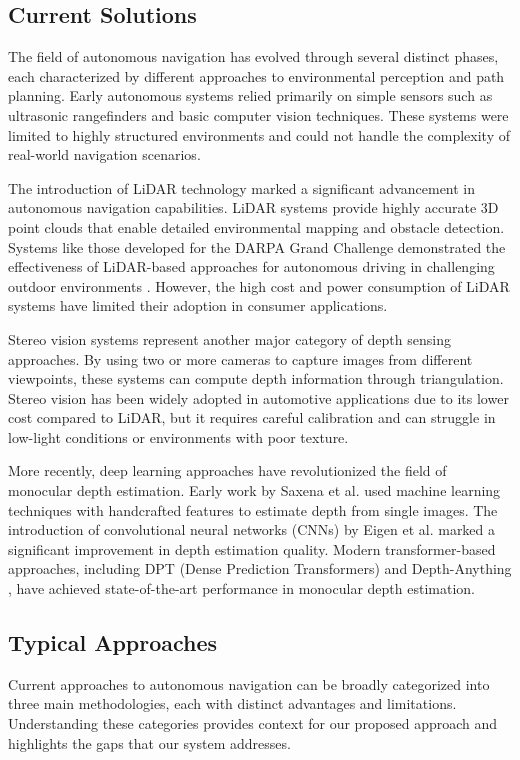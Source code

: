 \documentclass[conference]{IEEEtran}
\begin{document}
\subsection{Current Solutions}
The field of autonomous navigation has evolved through several distinct phases, each characterized by different approaches to environmental perception and path planning. Early autonomous systems relied primarily on simple sensors such as ultrasonic rangefinders and basic computer vision techniques. These systems were limited to highly structured environments and could not handle the complexity of real-world navigation scenarios.

The introduction of LiDAR technology marked a significant advancement in autonomous navigation capabilities. LiDAR systems provide highly accurate 3D point clouds that enable detailed environmental mapping and obstacle detection. Systems like those developed for the DARPA Grand Challenge demonstrated the effectiveness of LiDAR-based approaches for autonomous driving in challenging outdoor environments \cite{b1}. However, the high cost and power consumption of LiDAR systems have limited their adoption in consumer applications.

Stereo vision systems represent another major category of depth sensing approaches. By using two or more cameras to capture images from different viewpoints, these systems can compute depth information through triangulation. Stereo vision has been widely adopted in automotive applications due to its lower cost compared to LiDAR, but it requires careful calibration and can struggle in low-light conditions or environments with poor texture.

More recently, deep learning approaches have revolutionized the field of monocular depth estimation. Early work by Saxena et al. \cite{b4} used machine learning techniques with handcrafted features to estimate depth from single images. The introduction of convolutional neural networks (CNNs) by Eigen et al. \cite{b5} marked a significant improvement in depth estimation quality. Modern transformer-based approaches, including DPT (Dense Prediction Transformers) \cite{b6} and Depth-Anything \cite{b3}, have achieved state-of-the-art performance in monocular depth estimation.

\subsection{Typical Approaches}
Current approaches to autonomous navigation can be broadly categorized into three main methodologies, each with distinct advantages and limitations. Understanding these categories provides context for our proposed approach and highlights the gaps that our system addresses.
\end{document}
